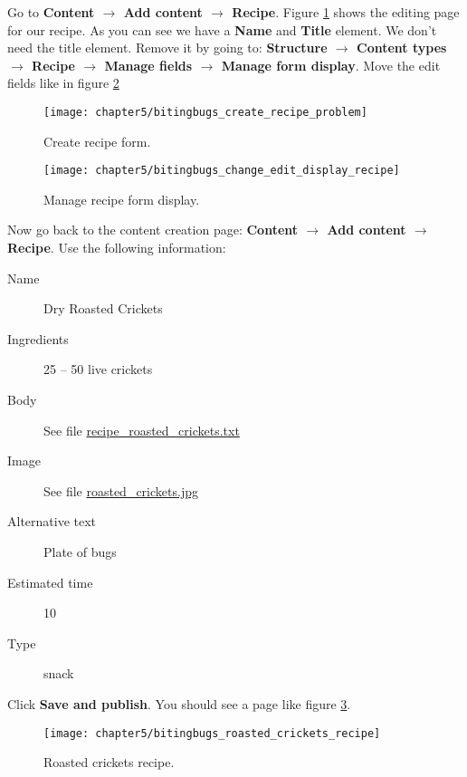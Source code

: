   Go to \textbf{Content $\rightarrow$ Add content $\rightarrow$ Recipe}. Figure \ref{fig:bitingbugs_create_recipe_problem} shows the editing page for our recipe. As you can see we have a \textbf{Name} and \textbf{Title} element. We don't need the title element. Remove it by going to: \textbf{Structure $\rightarrow$ Content types $\rightarrow$ Recipe $\rightarrow$ Manage fields $\rightarrow$ Manage form display}. Move the edit fields like in figure \ref{fig:bitingbugs_change_edit_display_recipe}
  
  \begin{figure}[H]
  	\centering
  	\texttt{[image: chapter5/bitingbugs\_create\_recipe\_problem]}
  	\caption{Create recipe form.}
  	\label{fig:bitingbugs_create_recipe_problem}
  \end{figure}
  
  \begin{figure}[H]
  	\centering
  	\texttt{[image: chapter5/bitingbugs\_change\_edit\_display\_recipe]}
  	\caption{Manage recipe form display.}
  	\label{fig:bitingbugs_change_edit_display_recipe}
  \end{figure}
  
  Now go back to the content creation page: \textbf{Content $\rightarrow$ Add content $\rightarrow$ Recipe}. Use the following information:
  
  \begin{description}
  	\item[Name] Dry Roasted Crickets
  	\item[Ingredients] 25 – 50 live crickets
  	\item[Body] See file \url{recipe_roasted_crickets.txt}
  	\item[Image] See file \url{roasted_crickets.jpg}
  	\item[Alternative text] Plate of bugs
  	\item[Estimated time] 10
  	\item[Type] snack
  \end{description}
  
  Click \textbf{Save and publish}. You should see a page like figure \ref{fig:bitingbugs_roasted_crickets_recipe}.
  
  \begin{figure}[H]
  	\centering
  	\texttt{[image: chapter5/bitingbugs\_roasted\_crickets\_recipe]}
  	\caption{Roasted crickets recipe.}
  	\label{fig:bitingbugs_roasted_crickets_recipe}
  \end{figure}
  
